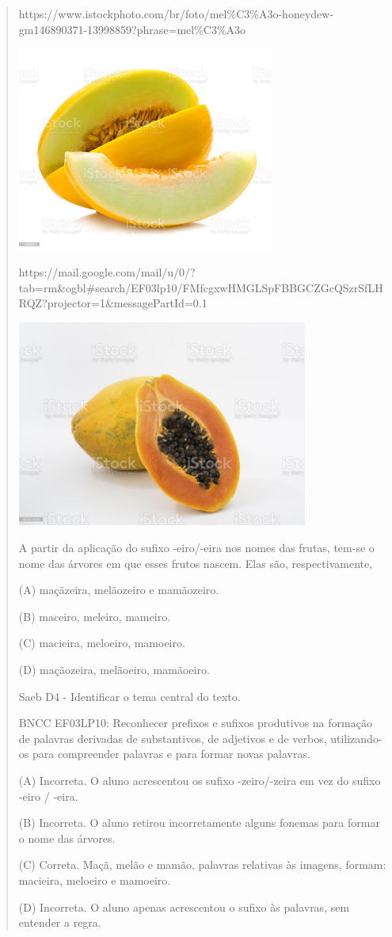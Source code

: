 \begin{quote}
https://www.istockphoto.com/br/foto/mel\%C3\%A3o-honeydew-gm146890371-13998859?phrase=mel\%C3\%A3o

\includegraphics[width=3.33412in,height=2.64722in]{media/image39.jpeg}

https://mail.google.com/mail/u/0/?tab=rm\&ogbl\#search/EF03lp10/FMfcgxwHMGLSpFBBGCZGcQSzrSfLHRQZ?projector=1\&messagePartId=0.1

\includegraphics[width=3.76501in,height=2.67500in]{media/image40.jpeg}

A partir da aplicação do sufixo -eiro/-eira nos nomes das frutas, tem-se
o nome das árvores em que esses frutos nascem. Elas são,
respectivamente,

(A) maçãzeira, melãozeiro e mamãozeiro.

(B) maceiro, meleiro, mameiro.

(C) macieira, meloeiro, mamoeiro.

(D) maçãozeira, melãoeiro, mamãoeiro.

Saeb D4 - Identificar o tema central do texto.

BNCC EF03LP10: Reconhecer prefixos e sufixos produtivos na formação de
palavras derivadas de substantivos, de adjetivos e de verbos,
utilizando-os para compreender palavras e para formar novas palavras.

(A) Incorreta. O aluno acrescentou os sufixo -zeiro/-zeira em vez do
sufixo -eiro / -eira.

(B) Incorreta. O aluno retirou incorretamente alguns fonemas para formar
o nome das árvores.

(C) Correta. Maçã, melão e mamão, palavras relativas às imagens, formam:
macieira, meloeiro e mamoeiro.

(D) Incorreta. O aluno apenas acrescentou o sufixo às palavras, sem
entender a regra.
\end{quote}

